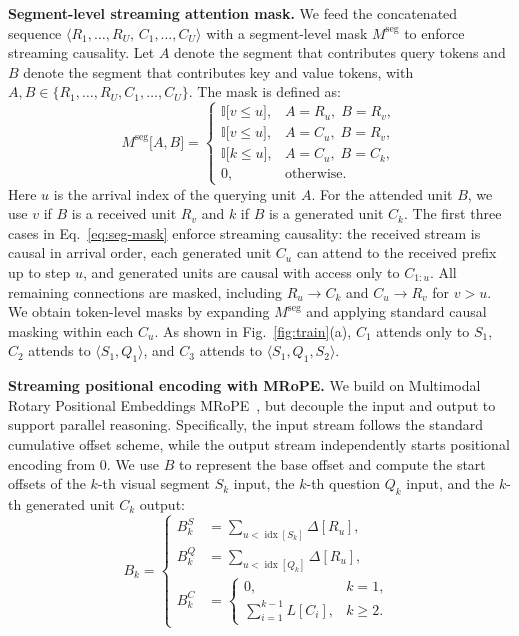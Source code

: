 \documentclass{article}
\begin{document}
\noindent\textbf{Segment-level streaming attention mask.}
We feed the concatenated sequence
$\langle R_1,\ldots,R_U,\, C_1,\ldots,C_U\rangle$ with a segment-level mask $M^{\mathrm{seg}}$ to enforce streaming causality. Let $A$ denote the segment that contributes query tokens and $B$ denote the segment that contributes key and value tokens, with
$A,B \in \{R_1,\ldots,R_U,C_1,\ldots,C_U\}$.
The mask is defined as:
\begin{equation}
M^{\mathrm{seg}}\lbrack A,B\rbrack=
\begin{cases}
\mathbb{I}\lbrack v \le u\rbrack, & A=R_u,\; B=R_v,\\
\mathbb{I}\lbrack v \le u\rbrack, & A=C_u,\; B=R_v,\\
\mathbb{I}\lbrack k \le u\rbrack, & A=C_u,\; B=C_k,\\
0, & \text{otherwise.}
\end{cases}
\label{eq:seg-mask}
\end{equation}
Here $u$ is the arrival index of the querying unit $A$. For the attended unit $B$, we use $v$ if $B$ is a received unit $R_v$ and $k$ if $B$ is a generated unit $C_k$. The first three cases in Eq.~\eqref{eq:seg-mask} enforce streaming causality: the received stream is causal in arrival order, each generated unit $C_u$ can attend to the received prefix up to step $u$, and generated units are causal with access only to $C_{1:u}$. All remaining connections are masked, including $R_u \rightarrow C_k$ and $C_u \rightarrow R_v$ for $v>u$. We obtain token-level masks by expanding $M^{\mathrm{seg}}$ and applying standard causal masking within each $C_u$. As shown in Fig.~\ref{fig:train}(a), $C_1$ attends only to $S_1$, $C_2$ attends to $\langle S_1,Q_1\rangle$, and $C_3$ attends to $\langle S_1,Q_1,S_2\rangle$.

\noindent\textbf{Streaming positional encoding with MRoPE.}
We build on Multimodal Rotary Positional Embeddings MRoPE~\cite{DBLP:journals/corr/abs-2409-12191}, but decouple the input and output to support parallel reasoning. Specifically, the input stream follows the standard cumulative offset scheme, while the output stream independently starts positional encoding from $0$. We use $B$ to represent the base offset and compute the start offsets of the $k$-th visual segment $S_k$ input, the $k$-th question $Q_k$ input, and the $k$-th generated unit $C_k$ output:
\begin{equation}
\label{eq:stream-mrope}
B_k =
\left\{
\begin{aligned}
B_k^{S} &= \sum_{u < \operatorname{idx}\!\left[ S_k \right]} \Delta\!\left[ R_u \right],\\
B_k^{Q} &= \sum_{u < \operatorname{idx}\!\left[ Q_k \right]} \Delta\!\left[ R_u \right],\\
B_k^{C} &=
\begin{cases}
0, & k=1,\\
\sum_{i=1}^{k-1} L\!\left[ C_i \right], & k\ge 2.
\end{cases}
\end{aligned}
\right.
\end{equation}
\end{document}
